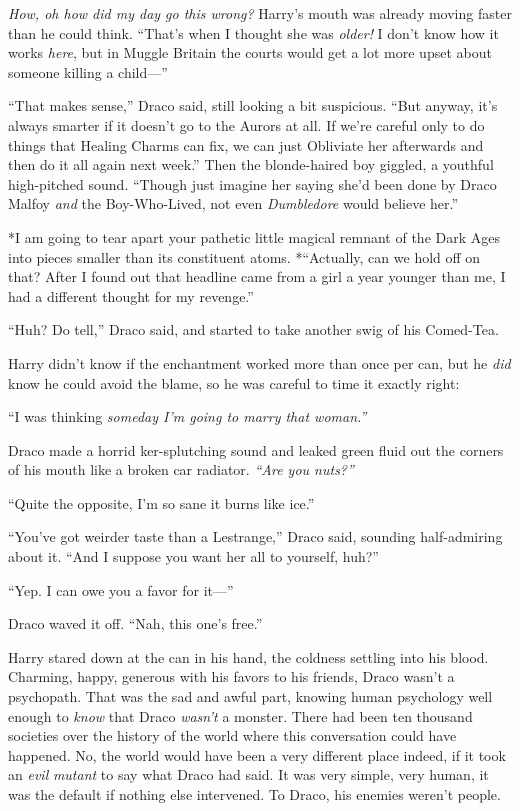 \emph{How, oh how did my day go this wrong?} Harry's mouth was already
moving faster than he could think. ``That's when I thought she was
\emph{older!} I don't know how it works \emph{here}, but in Muggle
Britain the courts would get a lot more upset about someone killing a
child---''

``That makes sense,'' Draco said, still looking a bit suspicious. ``But
anyway, it's always smarter if it doesn't go to the Aurors at all. If
we're careful only to do things that Healing Charms can fix, we can just
Obliviate her afterwards and then do it all again next week.'' Then the
blonde-haired boy giggled, a youthful high-pitched sound. ``Though just
imagine her saying she'd been done by Draco Malfoy \emph{and} the
Boy-Who-Lived, not even \emph{Dumbledore} would believe her.''

*I am going to tear apart your pathetic little magical remnant of the
Dark Ages into pieces smaller than its constituent atoms. *``Actually,
can we hold off on that? After I found out that headline came from a
girl a year younger than me, I had a different thought for my revenge.''

``Huh? Do tell,'' Draco said, and started to take another swig of his
Comed-Tea.

Harry didn't know if the enchantment worked more than once per can, but
he \emph{did} know he could avoid the blame, so he was careful to time
it exactly right:

``I was thinking \emph{someday I'm going to marry that woman.''}

Draco made a horrid ker-splutching sound and leaked green fluid out the
corners of his mouth like a broken car radiator. \emph{``Are you
nuts?''}

``Quite the opposite, I'm so sane it burns like ice.''

``You've got weirder taste than a Lestrange,'' Draco said, sounding
half-admiring about it. ``And I suppose you want her all to yourself,
huh?''

``Yep. I can owe you a favor for it---''

Draco waved it off. ``Nah, this one's free.''

Harry stared down at the can in his hand, the coldness settling into his
blood. Charming, happy, generous with his favors to his friends, Draco
wasn't a psychopath. That was the sad and awful part, knowing human
psychology well enough to \emph{know} that Draco \emph{wasn't} a
monster. There had been ten thousand societies over the history of the
world where this conversation could have happened. No, the world would
have been a very different place indeed, if it took an \emph{evil}
\emph{mutant} to say what Draco had said. It was very simple, very
human, it was the default if nothing else intervened. To Draco, his
enemies weren't people.

